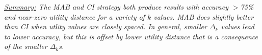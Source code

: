  
 

{\em \underline{Summary:} The MAB and CI strategy both produce results with 
accuracy $>$75\% and near-zero utility distance for a variety of $k$ values.
MAB does slightly better than CI when utlity values are closely spaced.
In general, smaller $\Delta_k$ values lead to lower accuracy, but this is offset by
lower utility distance that is a consequence of the smaller $\Delta_k$s. 
}


